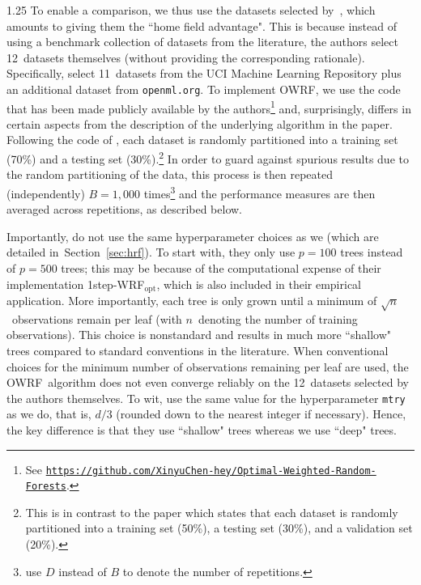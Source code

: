 \documentclass[12pt]{article}
\numberwithin{equation}{section}
\theoremstyle{plain}
\begin{document}
\begin{spacing}{1.25}
To enable a comparison, we thus use the datasets selected by~\cite{chen:yu:zhang:2024}, which amounts to giving them the ``home field advantage". This is because instead of using a benchmark collection of datasets from the literature, the authors select 12~datasets themselves (without providing the corresponding rationale). Specifically, \cite{chen:yu:zhang:2024} select 11~datasets from the UCI Machine Learning Repository plus an additional dataset from \texttt{openml.org}.
To implement OWRF, we use the code that has been made publicly available by the authors\footnote{See
\href{https://github.com/XinyuChen-hey/Optimal-Weighted-Random-Forests}
{\texttt{https://github.com/XinyuChen-hey/Optimal-Weighted-Random-Forests}}.}
and, surprisingly, differs in certain aspects from the description of the underlying algorithm in the paper.
Following the code of \cite{chen:yu:zhang:2024},
each dataset is randomly partitioned into a training set (70\%) and a testing set (30\%).\footnote{This is in contrast to the paper which states that each dataset is randomly partitioned into a training set (50\%), a testing set (30\%), and a validation set (20\%).} 
In order to guard
against spurious results due to the random partitioning of the data, this process is then repeated (independently) $B=1,000$ times\footnote{\cite{chen:yu:zhang:2024} use $D$ instead of $B$ to denote the number of repetitions.} and the performance measures are then averaged across repetitions, as described below.

Importantly, \cite{chen:yu:zhang:2024} do not use the same hyperparameter choices as we (which are detailed  in~Section~\ref{sec:hrf}). To start with, they only use $p=100$ trees instead of $p=500$ trees; this may be because of the computational expense of their implementation 1step-WRF\(_{\text{opt}}\), which is also included in their empirical application. More importantly, each tree is only grown until a minimum of $\sqrt{n}$~observations remain per leaf (with $n$~denoting the number of training observations). This choice is nonstandard and results in much more ``shallow" trees compared to standard conventions in the literature. When conventional choices for the minimum number of observations remaining per leaf are used, the OWRF~algorithm does not even converge reliably on the 12~datasets selected by the authors themselves. To wit, \cite{chen:yu:zhang:2024} use the same value for the hyperparameter \texttt{mtry} as we do, that is, $d/3$ (rounded down to the nearest integer if necessary).
Hence, the key difference is that they use ``shallow" trees whereas we use ``deep" trees.


\end{spacing}
\end{document}
